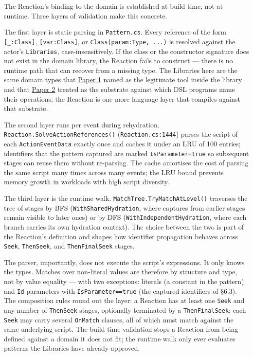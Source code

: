 \documentclass[
]{article}
\let\origtexttt\texttt%
\renewcommand{\texttt}[1]{\origtexttt{\seqsplit{#1}}}%
\let\texttt\origtexttt%
\begin{document}
The Reaction's binding to the domain is established at build time, not
at runtime. Three layers of validation make this concrete.

The first layer is static parsing in \texttt{Pattern.cs}. Every
reference of the form \texttt{{[}\_:Class{]}}, \texttt{{[}var:Class{]}},
or \texttt{Class(param:Type,\ ...)} is resolved against the actor's
\texttt{Libraries}, case-insensitively. If the class or the constructor
signature does not exist in the domain library, the Reaction fails to
construct --- there is no runtime path that can recover from a missing
type. The Libraries here are the same domain types that
\href{01-anti-porosity.md}{Paper 1} named as the legitimate tool inside
the library and that \href{02-program-value-separability.md}{Paper 2}
treated as the substrate against which DSL programs name their
operations; the Reaction is one more language layer that compiles
against that substrate.

The second layer runs per event during rehydration.
\texttt{Reaction.SolveActionReferences()} (\texttt{Reaction.cs:1444})
parses the script of each \texttt{ActionEventData} exactly once and
caches it under an LRU of 100 entries; identifiers that the pattern
captured are marked \texttt{IsParameter=true} so subsequent stages can
reuse them without re-parsing. The cache amortises the cost of parsing
the same script many times across many events; the LRU bound prevents
memory growth in workloads with high script diversity.

The third layer is the runtime walk.
\texttt{MatchTree.TryMatchAtLevel()} traverses the tree of stages by BFS
(\texttt{WithSharedHydration}, where captures from earlier stages remain
visible to later ones) or by DFS (\texttt{WithIndependentHydration},
where each branch carries its own hydration context). The choice between
the two is part of the Reaction's definition and shapes how identifier
propagation behaves across \texttt{Seek}, \texttt{ThenSeek}, and
\texttt{ThenFinalSeek} stages.

The parser, importantly, does not execute the script's expressions. It
only knows the types. Matches over non-literal values are therefore by
structure and type, not by value equality --- with two exceptions:
literals (a constant in the pattern) and \texttt{Id} parameters with
\texttt{IsParameter==true} (the captured identifiers of §6.3). The
composition rules round out the layer: a Reaction has at least one
\texttt{Seek} and any number of \texttt{ThenSeek} stages, optionally
terminated by a \texttt{ThenFinalSeek}; each \texttt{Seek} may carry
several \texttt{OnMatch} clauses, all of which must match against the
same underlying script. The build-time validation stops a Reaction from
being defined against a domain it does not fit; the runtime walk only
ever evaluates patterns the Libraries have already approved.
\end{document}
